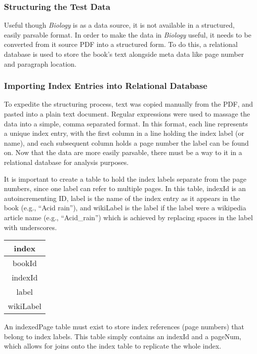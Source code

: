 \subsubsection{Structuring the Test Data}

Useful though {\it Biology} is as a data source, it is not available in a structured, easily parsable format.
In order to make the data in {\it Biology} useful, it needs to be converted from it source PDF into a structured form.
To do this, a relational database is used to store the book's text alongside meta data like page number and paragraph location.

\subsubsection{Importing Index Entries into Relational Database}

To expedite the structuring process, text was copied manually from the PDF, and pasted into a plain text document.
Regular expressions were used to massage the data into a simple, comma separated format.
In this format, each line represents a unique index entry, with the first column in a line holding the index label (or name), and each subsequent column holds a page number the label can be found on.
Now that the data are more easily parsable, there must be a way to it in a relational database for analysis purposes.

It is important to create a table to hold the index labels separate from the page numbers, since one label can refer to multiple pages.
In this table, indexId is an autoincrementing ID, label is the name of the index entry as it appears in the book (e.g., ``Acid rain''), and wikiLabel is the label if the label were a wikipedia article name (e.g., ``Acid\_rain'') which is achieved by replacing spaces in the label with underscores.

\begin{center}
\begin{tabular}{|c|}
\hline 
\textbf{index} \\ 
\hline 
bookId \\ 
\hline 
indexId \\ 
\hline 
label \\ 
\hline 
wikiLabel \\ 
\hline 
\end{tabular}
\end{center}
 
An indexedPage table must exist to store index references (page numbers) that belong to index labels.
This table simply contains an indexId and a pageNum, which allows for joins onto the index table to replicate the whole index.

